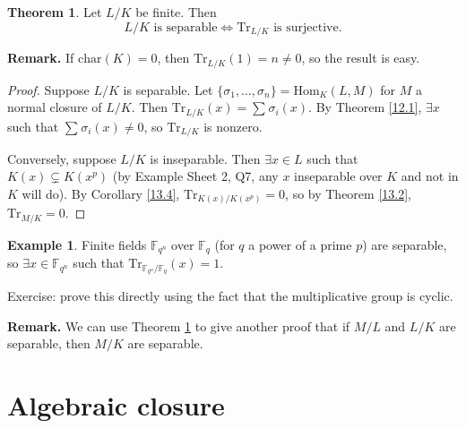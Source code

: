 \documentclass{article}
\theoremstyle{definition}
\newtheorem{theorem}{Theorem}[section]
\newtheorem{example}{Example}[section]
\begin{document}
\begin{theorem}\label{13.6}
    Let $L/K$ be finite. Then \[
    L/K \text{ is separable} \iff \text{Tr}_{L/K} \text{ is surjective.}
    \]
\end{theorem}
\textbf{Remark.} If $\text{char}(K)=0$, then $\text{Tr}_{L/K}(1)=n \neq 0$, so the result is easy.
\begin{proof}
    Suppose $L/K$ is separable. Let $\{\sigma_1,\ldots,\sigma_n\} = \text{Hom}_K(L,M)$ for $M$ a normal closure of $L/K$. Then $\text{Tr}_{L/K}(x) = \sum_{}^{} \sigma_i(x).$ By Theorem \ref{12.1}, $\exists x$ such that $\sum_{}^{} \sigma_i(x) \neq 0$, so $\text{Tr}_{L/K}$ is nonzero.
    \vspace{1mm}
    
    Conversely, suppose $L/K$ is inseparable. Then $\exists x \in L$ such that $K(x) \subsetneq K(x^p)$ (by Example Sheet 2, Q7, any $x$ inseparable over $K$ and not in $K$ will do). By Corollary \ref{13.4}, $\text{Tr}_{K(x)/K(x^p)} = 0$, so by Theorem \ref{13.2}, $\text{Tr}_{M/K}=0$.
\end{proof}
\begin{example}
    Finite fields $\mathbb{F}_{q^n}$ over $\mathbb{F}_q$ (for $q$ a power of a prime $p$) are separable, so $\exists x \in \mathbb{F}_{q^n}$ such that $\text{Tr}_{\mathbb{F}_{q^n}/\mathbb{F}_q}(x)=1$. 
    \vspace{1mm}
    
    Exercise: prove this directly using the fact that the multiplicative group is cyclic.
\end{example}
\textbf{Remark.} We can use Theorem \ref{13.6} to give another proof that if $M/L$ and $L/K$ are separable, then $M/K$ are separable.

\section{Algebraic closure}
\end{document}

